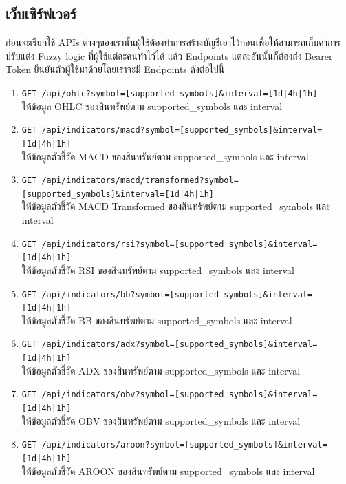 \subsection{เว็บเซิร์ฟเวอร์}
ก่อนจะเรียกใช้ APIs ต่างๆของเรานั้นผู้ใช้ต้องทำการสร้างบัญชีเอาไว้ก่อนเพื่อให้สามารถเก็บค่าการปรับแต่ง Fuzzy logic ที่ผู้ใช้แต่ละคนทำไว้ได้ แล้ว Endpoints
แต่ละอันนั้นก็ต้องส่ง Bearer Token ยืนยันตัวผู้ใช้มาด้วยโดยเราจะมี Endpoints ดังต่อไปนี้
\begin{enumerate}
    \overfullrule=0pt
    \item \texttt{GET {\footnotesize /api/ohlc?symbol=[supported\_symbols]\&interval=[1d|4h|1h]}} \\ให้ข้อมูล OHLC ของสินทรัพย์ตาม supported\_symbols และ interval
    \item \texttt{GET {\footnotesize /api/indicators/macd?symbol=[supported\_symbols]\&interval=[1d|4h|1h]}} \\ให้ข้อมูลตัวชี้วัด MACD ของสินทรัพย์ตาม supported\_symbols และ interval
    \item \texttt{GET {\footnotesize /api/indicators/macd/transformed?symbol=[supported\_symbols]\&interval=[1d|4h|1h]}} \\ให้ข้อมูลตัวชี้วัด MACD Transformed ของสินทรัพย์ตาม supported\_symbols และ interval
    \item \texttt{GET {\footnotesize /api/indicators/rsi?symbol=[supported\_symbols]\&interval=[1d|4h|1h]}} \\ให้ข้อมูลตัวชี้วัด RSI ของสินทรัพย์ตาม supported\_symbols และ interval
    \item \texttt{GET {\footnotesize /api/indicators/bb?symbol=[supported\_symbols]\&interval=[1d|4h|1h]}} \\ให้ข้อมูลตัวชี้วัด BB ของสินทรัพย์ตาม supported\_symbols และ interval
    \item \texttt{GET {\footnotesize /api/indicators/adx?symbol=[supported\_symbols]\&interval=[1d|4h|1h]}} \\ให้ข้อมูลตัวชี้วัด ADX ของสินทรัพย์ตาม supported\_symbols และ interval
    \item \texttt{GET {\footnotesize /api/indicators/obv?symbol=[supported\_symbols]\&interval=[1d|4h|1h]}} \\ให้ข้อมูลตัวชี้วัด OBV ของสินทรัพย์ตาม supported\_symbols และ interval
    \item \texttt{GET {\footnotesize /api/indicators/aroon?symbol=[supported\_symbols]\&interval=[1d|4h|1h]}} \\ให้ข้อมูลตัวชี้วัด AROON ของสินทรัพย์ตาม supported\_symbols และ interval

\end{enumerate}
